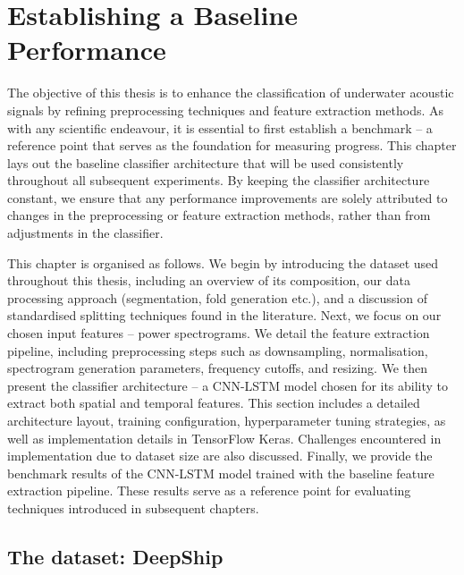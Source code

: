 \chapter{Establishing a Baseline Performance}


The objective of this thesis is to enhance the classification of underwater acoustic signals by refining preprocessing techniques and feature extraction methods. As with any scientific endeavour, it is essential to first establish a benchmark -- a reference point that serves as the foundation for measuring progress. This chapter lays out the baseline classifier architecture that will be used consistently throughout all subsequent experiments. By keeping the classifier architecture constant, we ensure that any performance improvements are solely attributed to changes in the preprocessing or feature extraction methods, rather than from adjustments in the classifier.

This chapter is organised as follows. We begin by introducing the dataset used throughout this thesis, including an overview of its composition, our data processing approach (segmentation, fold generation etc.), and a discussion of standardised splitting techniques found in the literature. Next, we focus on our chosen input features -- power spectrograms. We detail the feature extraction pipeline, including preprocessing steps such as downsampling, normalisation, spectrogram generation parameters, frequency cutoffs, and resizing. We then present the classifier architecture -- a CNN-LSTM model chosen for its ability to extract both spatial and temporal features. This section includes a detailed architecture layout, training configuration, hyperparameter tuning strategies, as well as implementation details in TensorFlow Keras. Challenges encountered in implementation due to dataset size are also discussed. Finally, we provide the benchmark results of the CNN-LSTM model trained with the baseline feature extraction pipeline. These results serve as a reference point for evaluating techniques introduced in subsequent chapters.

\section{The dataset: DeepShip}

